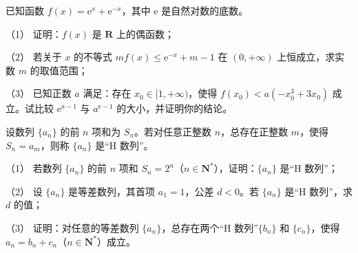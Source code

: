 \begin{question}
已知函数 $f(x)=\mathrm e^x+\mathrm e^{-x}$，其中 $\mathrm e$ 是自然对数的底数。

（1） 证明：$f(x)$ 是 $\mathbf R$ 上的偶函数；

（2） 若关于 $x$ 的不等式 $mf(x)\leqslant \mathrm e^{-x}+m-1$ 在 $(0,+\infty)$ 上恒成立，求实数 $m$ 的取值范围；

（3） 已知正数 $a$ 满足：存在 $x_0\in[1,+\infty)$，使得 $f(x_0)<a\left(-x_0^3+3x_0\right)$ 成立。试比较 $\mathrm e^{a-1}$ 与 $a^{\mathrm e-1}$ 的大小，并证明你的结论。

\end{question}
\begin{question}
设数列 $\{a_n\}$ 的前 $n$ 项和为 $S_n$。若对任意正整数 $n$，总存在正整数 $m$，使得 $S_n=a_m$，则称 $\{a_n\}$ 是“H 数列”。

（1） 若数列 $\{a_n\}$ 的前 $n$ 项和 $S_n=2^n$（$n\in\mathbf N^*$），证明：$\{a_n\}$ 是“H 数列”；

（2） 设 $\{a_n\}$ 是等差数列，其首项 $a_1=1$，公差 $d<0$。若 $\{a_n\}$ 是“H 数列”，求 $d$ 的值；

（3） 证明：对任意的等差数列 $\{a_n\}$，总存在两个“H 数列”$\{b_n\}$ 和 $\{c_n\}$，使得 $a_n=b_n+c_n$（$n\in\mathbf N^*$）成立。

\end{question}

